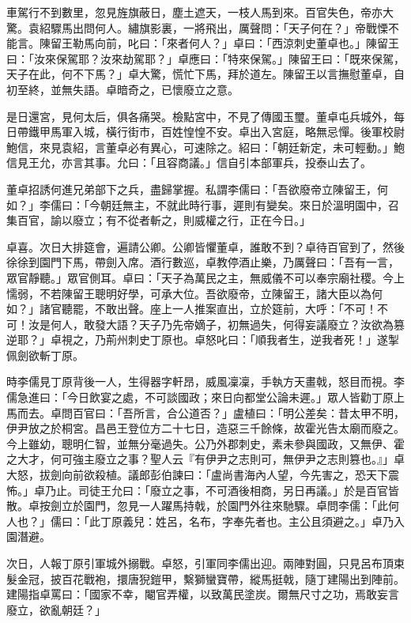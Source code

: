 車駕行不到數里，忽見旌旗蔽日，塵土遮天，一枝人馬到來。百官失色，帝亦大驚。袁紹驟馬出問何人。繡旗影裏，一將飛出，厲聲問：「天子何在？」帝戰慄不能言。陳留王勒馬向前，叱曰：「來者何人？」卓曰：「西涼刺史董卓也。」陳留王曰：「汝來保駕耶？汝來劫駕耶？」卓應曰：「特來保駕。」陳留王曰：「既來保駕，天子在此，何不下馬？」卓大驚，慌忙下馬，拜於道左。陳留王以言撫慰董卓，自初至終，並無失語。卓暗奇之，已懷廢立之意。

是日還宮，見何太后，俱各痛哭。檢點宮中，不見了傳國玉璽。董卓屯兵城外，每日帶鐵甲馬軍入城，橫行街市，百姓惶惶不安。卓出入宮庭，略無忌憚。後軍校尉鮑信，來見袁紹，言董卓必有異心，可速除之。紹曰：「朝廷新定，未可輕動。」鮑信見王允，亦言其事。允曰：「且容商議。」信自引本部軍兵，投泰山去了。

董卓招誘何進兄弟部下之兵，盡歸掌握。私謂李儒曰：「吾欲廢帝立陳留王，何如？」李儒曰：「今朝廷無主，不就此時行事，遲則有變矣。來日於溫明園中，召集百官，諭以廢立；有不從者斬之，則威權之行，正在今日。」

卓喜。次日大排筵會，遍請公卿。公卿皆懼董卓，誰敢不到？卓待百官到了，然後徐徐到園門下馬，帶劍入席。酒行數巡，卓教停酒止樂，乃厲聲曰：「吾有一言，眾官靜聽。」眾官側耳。卓曰：「天子為萬民之主，無威儀不可以奉宗廟社稷。今上懦弱，不若陳留王聰明好學，可承大位。吾欲廢帝，立陳留王，諸大臣以為何如？」諸官聽罷，不敢出聲。座上一人推案直出，立於筵前，大呼：「不可！不可！汝是何人，敢發大語？天子乃先帝嫡子，初無過失，何得妄議廢立？汝欲為篡逆耶？」卓視之，乃荊州刺史丁原也。卓怒叱曰：「順我者生，逆我者死！」遂掣佩劍欲斬丁原。

時李儒見丁原背後一人，生得器字軒昂，威風凜凜，手執方天畫戟，怒目而視。李儒急進曰：「今日飲宴之處，不可談國政；來日向都堂公論未遲。」眾人皆勸丁原上馬而去。卓問百官曰：「吾所言，合公道否？」盧植曰：「明公差矣：昔太甲不明，伊尹放之於桐宮。昌邑王登位方二十七日，造惡三千餘條，故霍光告太廟而廢之。今上雖幼，聰明仁智，並無分毫過失。公乃外郡刺史，素未參與國政，又無伊、霍之大才，何可強主廢立之事？聖人云『有伊尹之志則可，無伊尹之志則篡也。』」卓大怒，拔劍向前欲殺植。議郎彭伯諫曰：「盧尚書海內人望，今先害之，恐天下震怖。」卓乃止。司徒王允曰：「廢立之事，不可酒後相商，另日再議。」於是百官皆散。卓按劍立於園門，忽見一人躍馬持戟，於園門外往來馳驟。卓問李儒：「此何人也？」儒曰：「此丁原義兒：姓呂，名布，字奉先者也。主公且須避之。」卓乃入園潛避。

次日，人報丁原引軍城外搦戰。卓怒，引軍同李儒出迎。兩陣對圓，只見呂布頂束髮金冠，披百花戰袍，擐唐猊鎧甲，繫獅蠻寶帶，縱馬挺戟，隨丁建陽出到陣前。建陽指卓罵曰：「國家不幸，閹官弄權，以致萬民塗炭。爾無尺寸之功，焉敢妄言廢立，欲亂朝廷？」

